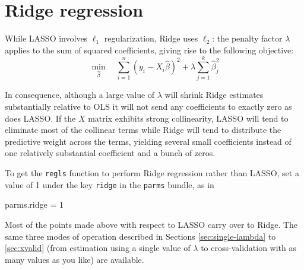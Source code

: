 \documentclass{article}
\begin{document}
\section{Ridge regression}
\label{sec:ridge}

While LASSO involves $\ell_1$ regularization, Ridge uses $\ell_2$: the
penalty factor $\lambda$ applies to the sum of squared coefficients,
giving rise to the following objective:
\begin{equation}
  \label{eq:ridge-obj}
  \min_{\hat{\beta}} \quad
  \sum_{i=1}^n (y_i - X_i\hat{\beta})^2 + \lambda \sum_{j=1}^k \hat{\beta}_j^2
\end{equation}

In consequence, although a large value of $\lambda$ will shrink Ridge
estimates substantially relative to OLS it will not send any
coefficients to exactly zero as does LASSO. If the $X$ matrix exhibits
strong collinearity, LASSO will tend to eliminate most of the
collinear terms while Ridge will tend to distribute the predictive
weight across the terms, yielding several small coefficients instead
of one relatively substantial coefficient and a bunch of zeros.

To get the \texttt{regls} function to perform Ridge regression rather
than LASSO, set a value of 1 under the key \texttt{ridge} in the
\texttt{parms} bundle, as in
\begin{code}
parms.ridge = 1
\end{code}

Most of the points made above with respect to LASSO carry over to
Ridge. The same three modes of operation described in Sections
\ref{sec:single-lambda} to \ref{sec:xvalid} (from estimation using a
single value of $\lambda$ to cross-validation with as many values as
you like) are available.
\end{document}
